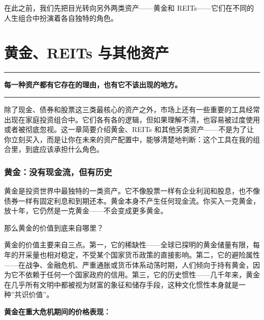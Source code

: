 \documentclass[a4paper,11pt,oneside,fontset=none,UTF8,zihao=-4]{ctexbook}
\begin{document}
在此之前，我们先把目光转向另外两类资产------黄金和
REITs------它们在不同的人生组合中扮演着各自独特的角色。

\newpage

\chapter{黄金、REITs
与其他资产}\label{ux9ec4ux91d1reits-ux4e0eux5176ux4ed6ux8d44ux4ea7}

\begin{center}{\color{dh-bronze}\rule{0.2\textwidth}{0.5pt}}\end{center}

\begin{dhquote}
\textbf{每一种资产都有它存在的理由，也有它不该出现的地方。}
\end{dhquote}

\begin{center}{\color{dh-bronze}\rule{0.2\textwidth}{0.5pt}}\end{center}

除了现金、债券和股票这三类最核心的资产之外，市场上还有一些重要的工具经常出现在家庭投资组合中。它们各有各的逻辑，但如果理解不清，也容易被过度使用或者被彻底忽视。这一章简要介绍黄金、REITs
和其他另类资产------不是为了让你立刻买入，而是让你在未来的资产配置中，能够清楚地判断：这个工具在我的组合里，到底应该承担什么角色。

\subsection{黄金：没有现金流，但有历史}\label{ux9ec4ux91d1ux6ca1ux6709ux73b0ux91d1ux6d41ux4f46ux6709ux5386ux53f2}

黄金是投资世界中最独特的一类资产。它不像股票一样有企业利润和股息，也不像债券一样有固定利息和到期还本。黄金本身不产生任何现金流。你买入一克黄金，放十年，它仍然是一克黄金------不会变成更多黄金。

那么黄金的价值到底来自哪里？

黄金的价值主要来自三点。第一，它的稀缺性------全球已探明的黄金储量有限，每年的开采量也相对稳定，不受某个国家货币政策的直接影响。第二，它的避险属性------在战争、金融危机、严重通胀或货币体系动荡时期，人们倾向于持有黄金，因为它不依赖于任何一个国家政府的信用。第三，它的历史惯性------几千年来，黄金在几乎所有文明中都被视为财富的象征和储存手段，这种文化惯性本身就是一种''共识价值''。

\textbf{黄金在重大危机期间的价格表现：}
\end{document}
